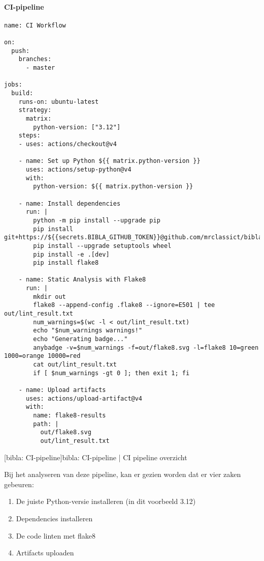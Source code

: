 \paragraph{CI-pipeline}
\begin{verbatim}
name: CI Workflow

on:
  push:
    branches:
      - master

jobs:
  build:
    runs-on: ubuntu-latest
    strategy:
      matrix:
        python-version: ["3.12"]
    steps:
    - uses: actions/checkout@v4

    - name: Set up Python ${{ matrix.python-version }}
      uses: actions/setup-python@v4
      with:
        python-version: ${{ matrix.python-version }}

    - name: Install dependencies
      run: |
        python -m pip install --upgrade pip
        pip install git+https://${{secrets.BIBLA_GITHUB_TOKEN}}@github.com/mrclassict/bibla.git
        pip install --upgrade setuptools wheel
        pip install -e .[dev]
        pip install flake8

    - name: Static Analysis with Flake8
      run: |
        mkdir out
        flake8 --append-config .flake8 --ignore=E501 | tee out/lint_result.txt
        num_warnings=$(wc -l < out/lint_result.txt)
        echo "$num_warnings warnings!"
        echo "Generating badge..."
        anybadge -v=$num_warnings -f=out/flake8.svg -l=flake8 10=green 1000=orange 10000=red
        cat out/lint_result.txt
        if [ $num_warnings -gt 0 ]; then exit 1; fi

    - name: Upload artifacts
      uses: actions/upload-artifact@v4
      with:
        name: flake8-results
        path: |
          out/flake8.svg
          out/lint_result.txt
\end{verbatim}
[bibla: \acrshort{CI}-pipeline]{bibla: \acrshort{CI}-pipeline | \acrfull{CI} pipeline overzicht \label{lst:bibla_CI}}

Bij het analyseren van deze pipeline, kan er gezien worden dat er vier zaken gebeuren:
\begin{enumerate}
    \item De juiste Python-versie installeren (in dit voorbeeld 3.12)
    \item Dependencies installeren
    \item De code linten met flake8
    \item Artifacts uploaden
\end{enumerate}

